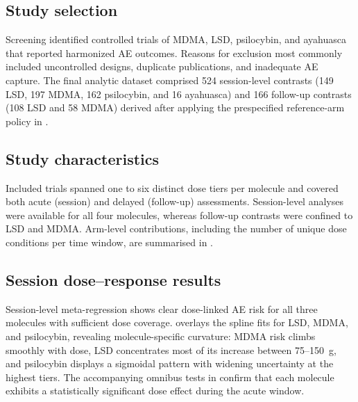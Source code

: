 \subsection{Study selection}
Screening identified controlled trials of MDMA, LSD, psilocybin, and ayahuasca that reported harmonized AE outcomes. Reasons for exclusion most commonly included uncontrolled designs, duplicate publications, and inadequate AE capture. The final analytic dataset comprised 524 session-level contrasts (149 LSD, 197 MDMA, 162 psilocybin, and 16 ayahuasca) and 166 follow-up contrasts (108 LSD and 58 MDMA) derived after applying the prespecified reference-arm policy in .

\subsection{Study characteristics}
Included trials spanned one to six distinct dose tiers per molecule and covered both acute (session) and delayed (follow-up) assessments. Session-level analyses were available for all four molecules, whereas follow-up contrasts were confined to LSD and MDMA. Arm-level contributions, including the number of unique dose conditions per time window, are summarised in .

\subsection{Session dose--response results}
Session-level meta-regression shows clear dose-linked AE risk for all three molecules with sufficient dose coverage.  overlays the spline fits for LSD, MDMA, and psilocybin, revealing molecule-specific curvature: MDMA risk climbs smoothly with dose, LSD concentrates most of its increase between 75--150~\textmu g, and psilocybin displays a sigmoidal pattern with widening uncertainty at the highest tiers. The accompanying omnibus tests in  confirm that each molecule exhibits a statistically significant dose effect during the acute window.


